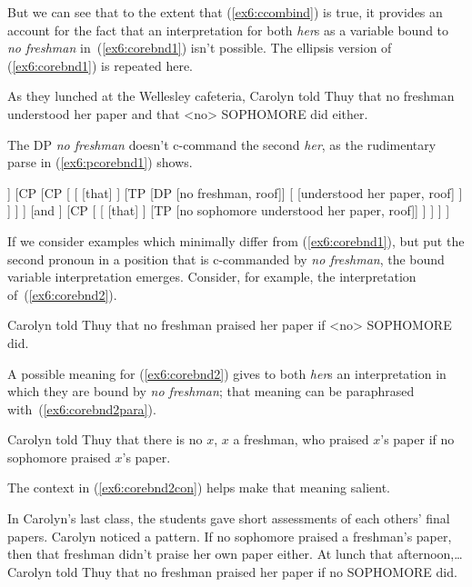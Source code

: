 But we can see that to the extent that (\ref{ex6:ccombind}) is true, it provides an account for the fact that an interpretation for both \emph{her}s as a variable bound to \emph{no freshman} in~(\ref{ex6:corebnd1}) isn't possible. The ellipsis version of (\ref{ex6:corebnd1}) is repeated here.
\begin{exe}
	\raggedright
	As they lunched at the Wellesley cafeteria, Carolyn told Thuy that no freshman understood her paper and that <no> SOPHOMORE did either.
\end{exe}
The DP \emph{no freshman} doesn't c-command the second \emph{her}, as the rudimentary parse in (\ref{ex6:pcorebnd1}) shows.
\medskip
\begin{fullwidth}
\begin{exe}
	\raggedright
	\ex \label{ex6:pcorebnd1}
	\small
\begin{forest}
[\ibar{V}
	[\obar{V} [tell]]
	[CP 
		[CP 
		[
			[ [that] ]
			[TP 
				[DP [no freshman, roof]]
				[ [understood her paper, roof] ]
			]
		]
		]
		[and ]
		[CP 
		[
			[ [that] ]
			[TP [no sophomore understood her paper, roof]]
		]
		]
	]
]
\end{forest}
\end{exe}
\end{fullwidth}
\medskip
If we consider examples which minimally differ from (\ref{ex6:corebnd1}), but put the second pronoun in a position that is c-commanded by \emph{no freshman}, the bound variable interpretation emerges. Consider, for example, the interpretation of~(\ref{ex6:corebnd2}).
\begin{exe}
	\raggedright
	\ex \label{ex6:corebnd2}
	Carolyn told Thuy that no freshman praised her paper if <no> SOPHOMORE did.
\end{exe}
A possible meaning for (\ref{ex6:corebnd2}) gives to both \emph{her}s an interpretation in which they are bound by \emph{no freshman}; that meaning can be paraphrased with~(\ref{ex6:corebnd2para}).
\begin{exe}
	\raggedright
	\ex \label{ex6:corebnd2para}
	Carolyn told Thuy that there is no $x$, $x$ a freshman, who praised $x$'s paper if no sophomore praised $x$'s paper.
\end{exe}
The context in (\ref{ex6:corebnd2con}) helps make that meaning salient.
\pagebreak
\begin{exe}
	\raggedright
	\sn
	In Carolyn's last class, the students gave short assessments of each others' final papers. Carolyn noticed a pattern. If no sophomore praised a freshman's paper, then that freshman didn't praise her own paper either. At lunch that afternoon,\ldots
	\ex \label{ex6:corebnd2con} Carolyn told Thuy that no freshman praised her paper if no SOPHOMORE did.
\end{exe}
